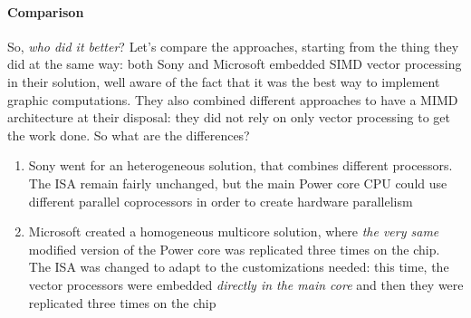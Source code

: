 \documentclass[10pt,a4paper]{article}
\begin{document}
					\paragraph{Comparison}
						So, \emph{who did it better}? Let's compare the approaches, starting from the thing they did at the same way: both Sony and Microsoft embedded SIMD vector processing in their solution, well aware of the fact that it was the best way to implement graphic computations. They also combined different approaches to have a MIMD architecture at their disposal: they did not rely on only vector processing to get the work done. So what are the differences?
						\begin{enumerate}
							\item Sony went for an heterogeneous solution, that combines different processors. The ISA remain fairly unchanged, but the main Power core CPU could use different parallel coprocessors in order to create hardware parallelism
							\item Microsoft created a homogeneous multicore solution, where \emph{the very same} modified version of the Power core was replicated three times on the chip. The ISA was changed to adapt to the customizations needed: this time, the vector processors were embedded \emph{directly in the main core} and then they were replicated three times on the chip
						\end{enumerate}
\end{document}
